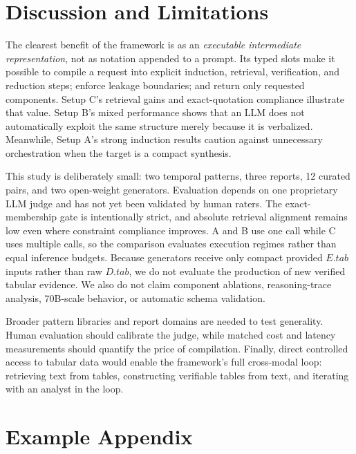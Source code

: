 \documentclass[sigconf,nonacm,anonymous]{acmart}
\begin{document}
\section{Discussion and Limitations}
\label{sec:discussion}

The clearest benefit of the framework is as an \emph{executable intermediate representation}, not as notation appended to a prompt. Its typed slots make it possible to compile a request into explicit induction, retrieval, verification, and reduction steps; enforce leakage boundaries; and return only requested components. Setup C's retrieval gains and exact-quotation compliance illustrate that value. Setup B's mixed performance shows that an LLM does not automatically exploit the same structure merely because it is verbalized. Meanwhile, Setup A's strong induction results caution against unnecessary orchestration when the target is a compact synthesis.

This study is deliberately small: two temporal patterns, three reports, 12 curated pairs, and two open-weight generators. Evaluation depends on one proprietary LLM judge and has not yet been validated by human raters. The exact-membership gate is intentionally strict, and absolute retrieval alignment remains low even where constraint compliance improves. A and B use one call while C uses multiple calls, so the comparison evaluates execution regimes rather than equal inference budgets. Because generators receive only compact provided $E.tab$ inputs rather than raw $D.tab$, we do not evaluate the production of new verified tabular evidence. We also do not claim component ablations, reasoning-trace analysis, 70B-scale behavior, or automatic schema validation.

Broader pattern libraries and report domains are needed to test generality. Human evaluation should calibrate the judge, while matched cost and latency measurements should quantify the price of compilation. Finally, direct controlled access to tabular data would enable the framework's full cross-modal loop: retrieving text from tables, constructing verifiable tables from text, and iterating with an analyst in the loop.




\appendix

\section{Example Appendix}
\label{sec:appendix}
\end{document}
